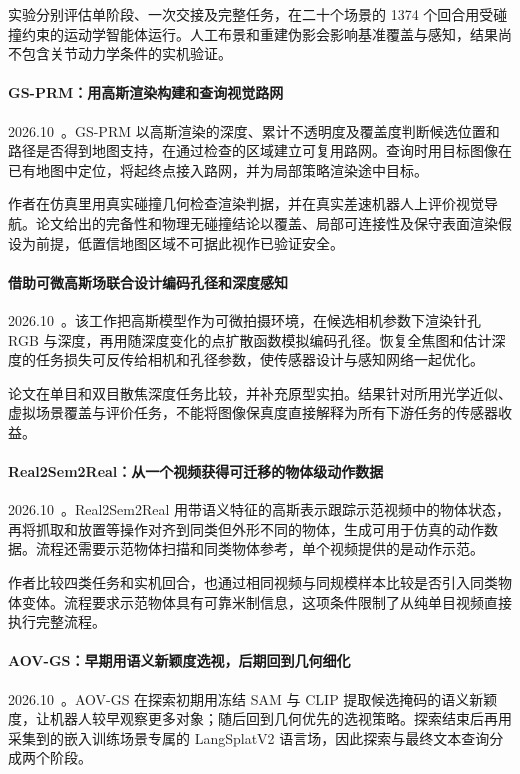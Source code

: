 实验分别评估单阶段、一次交接及完整任务，在二十个场景的 1374 个回合用受碰撞约束的运动学智能体运行。人工布景和重建伪影会影响基准覆盖与感知，结果尚不包含关节动力学条件的实机验证。

\paragraph{GS-PRM：用高斯渲染构建和查询视觉路网}
2026.10~\cite{2610_19541}。GS-PRM 以高斯渲染的深度、累计不透明度及覆盖度判断候选位置和路径是否得到地图支持，在通过检查的区域建立可复用路网。查询时用目标图像在已有地图中定位，将起终点接入路网，并为局部策略渲染途中目标。

作者在仿真里用真实碰撞几何检查渲染判据，并在真实差速机器人上评价视觉导航。论文给出的完备性和物理无碰撞结论以覆盖、局部可连接性及保守表面渲染假设为前提，低置信地图区域不可据此视作已验证安全。

\paragraph{借助可微高斯场联合设计编码孔径和深度感知}
2026.10~\cite{2610_28004}。该工作把高斯模型作为可微拍摄环境，在候选相机参数下渲染针孔 RGB 与深度，再用随深度变化的点扩散函数模拟编码孔径。恢复全焦图和估计深度的任务损失可反传给相机和孔径参数，使传感器设计与感知网络一起优化。

论文在单目和双目散焦深度任务比较，并补充原型实拍。结果针对所用光学近似、虚拟场景覆盖与评价任务，不能将图像保真度直接解释为所有下游任务的传感器收益。

\paragraph{Real2Sem2Real：从一个视频获得可迁移的物体级动作数据}
2026.10~\cite{2610_28880}。Real2Sem2Real 用带语义特征的高斯表示跟踪示范视频中的物体状态，再将抓取和放置等操作对齐到同类但外形不同的物体，生成可用于仿真的动作数据。流程还需要示范物体扫描和同类物体参考，单个视频提供的是动作示范。

作者比较四类任务和实机回合，也通过相同视频与同规模样本比较是否引入同类物体变体。流程要求示范物体具有可靠米制信息，这项条件限制了从纯单目视频直接执行完整流程。

\paragraph{AOV-GS：早期用语义新颖度选视，后期回到几何细化}
2026.10~\cite{2610_29374}。AOV-GS 在探索初期用冻结 SAM 与 CLIP 提取候选掩码的语义新颖度，让机器人较早观察更多对象；随后回到几何优先的选视策略。探索结束后再用采集到的嵌入训练场景专属的 LangSplatV2 语言场，因此探索与最终文本查询分成两个阶段。

